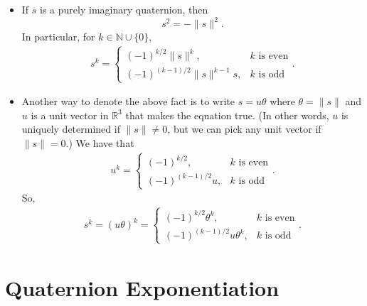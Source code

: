 \documentclass[10pt]{article}
\newcommand{\Real}{\mathbb{R}}
\begin{document}
\begin{itemize}
    \item If $s$ is a purely imaginary quaternion, then $$s^2 = -\|s\|^2.$$
    In particular, for $k \in \mathbb{N} \cup \{0\}$,
    \begin{align*}
        s^k = \begin{cases}
            (-1)^{k/2} \|s\|^{k}, & \mbox{$k$ is even} \\
            (-1)^{(k-1)/2} \|s\|^{k-1} s, & \mbox{$k$ is odd}
        \end{cases}.
    \end{align*}

    \item Another way to denote the above fact is to write $s = u\theta$ where $\theta = \| s \|$ and $u$ is a unit vector in $\Real^3$ that makes the equation true. (In other words, $u$ is uniquely determined if $\| s \| \neq 0$, but we can pick any unit vector if $\| s \| = 0$.) We have that
    \begin{align*}
        u^k = \begin{cases}
            (-1)^{k/2} , & \mbox{$k$ is even} \\
            (-1)^{(k-1)/2} u, & \mbox{$k$ is odd}
        \end{cases}.
    \end{align*}
    So,
    \begin{align*}
        s^k = (u \theta)^k = \begin{cases}
            (-1)^{k/2} \theta^k , & \mbox{$k$ is even} \\
            (-1)^{(k-1)/2} u \theta^k, & \mbox{$k$ is odd}
        \end{cases}.
    \end{align*}    
\end{itemize}

\section{Quaternion Exponentiation}
\end{document}
